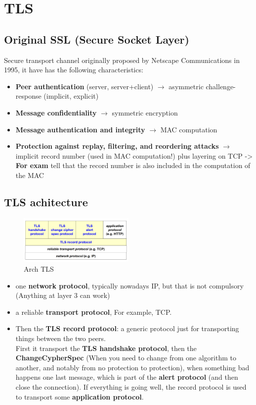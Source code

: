 \chapter{TLS}

\section{Original SSL (Secure Socket Layer)}
Secure transport channel originally proposed by Netscape Communications in 1995, it have has the following characteristics:
\begin{itemize} 
    \item \textbf{Peer authentication} (server, server+client) $\rightarrow$ asymmetric challenge-response (implicit, explicit)
    \item \textbf{Message confidentiality} $\rightarrow$ symmetric encryption
    \item \textbf{Message authentication and integrity} $\rightarrow$ MAC computation
    \item \textbf{Protection against replay, filtering, and reordering attacks} $\rightarrow$ implicit record number (used in MAC computation!) plus 
    layering on TCP -> \textbf{For exam} tell that the record number is also included in the computation of the MAC
\end{itemize}

\section{TLS achitecture}

\begin{figure}[ht]
    \centering
    \includegraphics[width=0.5\textwidth]{img/tls_arch.png}
    \caption{Arch TLS}
    \label{fig:tls_arch}
\end{figure}

\begin{itemize}
    \item one \textbf{network protocol}, typically nowadays IP, but that is not compulsory (Anything at layer 3 can work)
    \item  a reliable \textbf{transport protocol}, For example, TCP.
    \item Then the \textbf{TLS record protocol}: a generic protocol just for transporting things between the two peers. \\
            First it transport the \textbf{TLS handshake protocol}, then the \textbf{ChangeCypherSpec} (When you need to change from one algorithm to another, and notably from no protection to protection),
            when something bad happens  one last message, which is part of the \textbf{alert protocol} (and then close the connection). If everything is going well, the record protocol is used to transport some \textbf{application protocol}.

    
\end{itemize}

